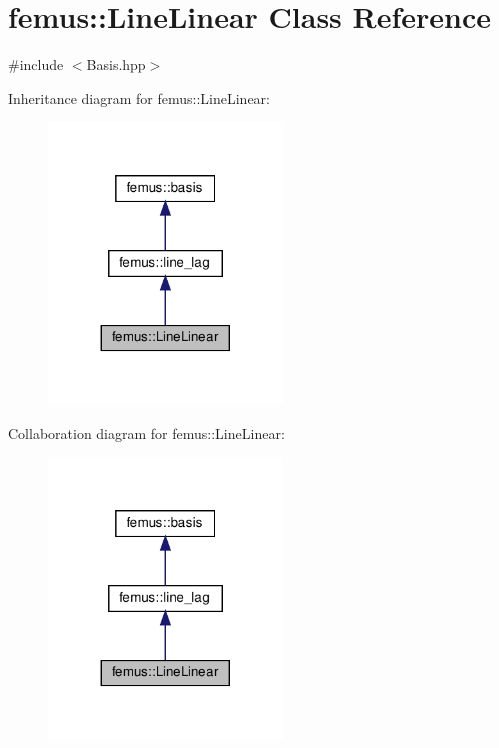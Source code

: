 \hypertarget{classfemus_1_1_line_linear}{}\section{femus\+:\+:Line\+Linear Class Reference}
\label{classfemus_1_1_line_linear}


{\ttfamily \#include $<$Basis.\+hpp$>$}



Inheritance diagram for femus\+:\+:Line\+Linear\+:
\nopagebreak
\begin{figure}[H]
\begin{center}
\leavevmode
\includegraphics[width=176pt]{classfemus_1_1_line_linear__inherit__graph}
\end{center}
\end{figure}


Collaboration diagram for femus\+:\+:Line\+Linear\+:
\nopagebreak
\begin{figure}[H]
\begin{center}
\leavevmode
\includegraphics[width=176pt]{classfemus_1_1_line_linear__coll__graph}
\end{center}
\end{figure}
